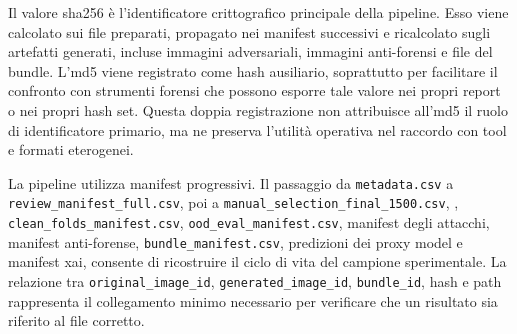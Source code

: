 Il valore \gls{sha256} è l'identificatore crittografico principale della pipeline.
Esso viene calcolato sui file preparati, propagato nei manifest successivi e
ricalcolato sugli artefatti generati, incluse immagini adversariali, immagini
anti-forensi e file del bundle. L'\gls{md5} viene registrato come hash ausiliario,
soprattutto per facilitare il confronto con strumenti forensi che possono
esporre tale valore nei propri report o nei propri hash set. Questa doppia
registrazione non attribuisce all'\gls{md5} il ruolo di identificatore primario, ma ne
preserva l'utilità operativa nel raccordo con tool e formati eterogenei.

La pipeline utilizza manifest progressivi. Il passaggio da
\texttt{metadata.csv} a \texttt{review\_manifest\_full.csv}, poi a
\texttt{manual\_selection\_final\_1500.csv},
,
\texttt{clean\_folds\_manifest.csv}, \texttt{ood\_eval\_manifest.csv},
manifest degli attacchi, manifest anti-forense, \texttt{bundle\_manifest.csv},
predizioni dei proxy model e manifest \gls{xai}, consente di ricostruire il
ciclo di vita del campione sperimentale. La relazione tra
\texttt{original\_image\_id}, \texttt{generated\_image\_id},
\texttt{bundle\_id}, hash e path rappresenta il collegamento minimo necessario
per verificare che un risultato sia riferito al file corretto.

